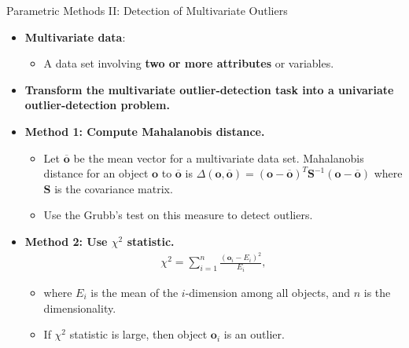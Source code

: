 \begin{frame}{Parametric Methods II: Detection of Multivariate Outliers}
	\begin{itemize}
		\item \textbf{Multivariate data}:
		      \begin{itemize}
			      \item A data set involving \textbf{\color{airforceblue}two or more attributes} or variables.
		      \end{itemize}
		\item \textbf{Transform the multivariate outlier-detection task into a univariate outlier-detection problem.}
		\item \textbf{Method 1: Compute Mahalanobis distance.}
		      \begin{itemize}
			      \item Let $\mathbf{\overline{o}}$ be the mean vector for a multivariate data set. Mahalanobis distance for an object $\mathbf{o}$ to $\mathbf{\overline{o}}$ is $\Delta(\mathbf{o}, \mathbf{\overline{o}}) = (\mathbf{o} - \mathbf{\overline{o}})^T \mathbf{S}^{-1} (\mathbf{o} - \mathbf{\overline{o}})$ where $\mathbf{S}$ is the covariance matrix.
			      \item Use the Grubb's test on this measure to detect outliers.
		      \end{itemize}
		\item \textbf{Method 2: Use $\chi^2$ statistic.}
		      \vspace*{-1em}
		      \begin{align*}
			      \chi^2 = \sum^n_{i=1} \frac{(\mathbf{o}_i-E_i)^2}{E_i},
		      \end{align*}
		      \vspace*{-1em}
		      \begin{itemize}
			      \item where $E_i$ is the mean of the $i$-dimension among all objects, and $n$ is the dimensionality.
			      \item If $\chi^2$ statistic is large, then object $\mathbf{o}_i$ is an outlier.
		      \end{itemize}
	\end{itemize}
\end{frame}


